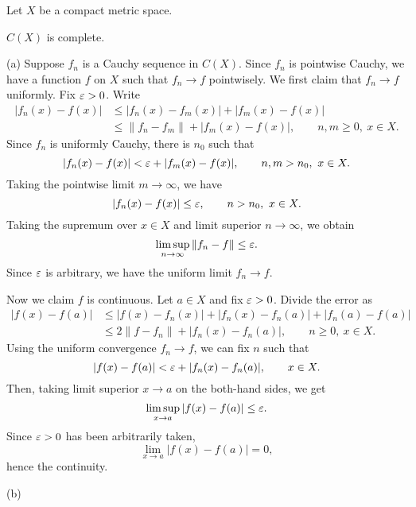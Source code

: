 \documentclass{../../large}
\begin{document}
\begin{prb}
Let $X$ be a compact metric space.
\begin{parts}
\item $C(X)$ is complete.
\end{parts}
\end{prb}
\begin{pf}
(a)
Suppose $f_n$ is a Cauchy sequence in $C(X)$.
Since $f_n$ is pointwise Cauchy, we have a function $f$ on $X$ such that $f_n\to f$ pointwisely.
We first claim that $f_n\to f$ uniformly.
Fix $\varepsilon>0$.
Write
\begin{align*}
|f_n(x)-f(x)|
&\le|f_n(x)-f_m(x)|+|f_m(x)-f(x)|\\
&\le\|f_n-f_m\|+|f_m(x)-f(x)|,\qquad n,m\ge0,\ x\in X.
\end{align*}
Since $f_n$ is uniformly Cauchy, there is $n_0$ such that
\[|f_n(x)-f(x)|<\varepsilon+|f_m(x)-f(x)|,\qquad n,m>n_0,\ x\in X.\]
Taking the pointwise limit $m\to\infty$, we have
\[|f_n(x)-f(x)|\le\varepsilon,\qquad n>n_0,\ x\in X.\]
Taking the supremum over $x\in X$ and limit superior $n\to\infty$, we obtain
\[\limsup_{n\to\infty}\|f_n-f\|\le\varepsilon.\]
Since $\varepsilon$ is arbitrary, we have the uniform limit $f_n\to f$.

Now we claim $f$ is continuous.
Let $a\in X$ and fix $\varepsilon>0$.
Divide the error as
\begin{align*}
|f(x)-f(a)|
&\le|f(x)-f_n(x)|+|f_n(x)-f_n(a)|+|f_n(a)-f(a)|\\
&\le2\|f-f_n\|+|f_n(x)-f_n(a)|,\qquad n\ge0,\ x\in X.
\end{align*}
Using the uniform convergence $f_n\to f$, we can fix $n$ such that
\[|f(x)-f(a)|<\varepsilon+|f_n(x)-f_n(a)|,\qquad x\in X.\]
Then, taking limit superior $x\to a$ on the both-hand sides, we get
\[\limsup_{x\to a}|f(x)-f(a)|\le\varepsilon.\]
Since $\varepsilon>0$ has been arbitrarily taken,
\[\lim_{x\to a}|f(x)-f(a)|=0,\]
hence the continuity.

(b)

\end{pf}


\section{}

\begin{prb}
\end{prb}
\begin{prb}
\end{prb}
\begin{prb}
\end{prb}
\end{document}
